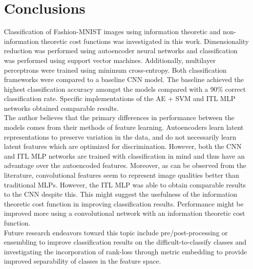 \documentclass[conference]{IEEEtran}
\begin{document}
\section{Conclusions} \label{Conclusions}
Classification of Fashion-MNIST images using information theoretic and non-information theoretic cost functions was investigated in this work.  Dimensionality reduction was performed using autoencoder neural networks and classification was performed using support vector machines. Additionally, multilayer perceptrons were trained using minimum cross-entropy.  Both classification frameworks were compared to a baseline CNN model.  The baseline achieved the highest classification accuracy amongst the models compared with a 90\% correct classification rate.  Specific implementations of the AE + SVM and ITL MLP networks obtained comparable results.\\
\indent The author believes that the primary differences in performance between the models comes from their methods of feature learning.  Autoencoders learn latent representations to preserve variation in the data, and do not necessarily learn latent features which are optimized for  discrimination.  However, both the CNN and ITL MLP networks are trained with classification in mind and thus have an advantage over the autoencoded features.  Moreover, as can be observed from the literature, convolutional features seem to represent image qualities better than traditional MLPs. However, the ITL MLP was able to obtain comparable results to the CNN despite this.  This might suggest the usefulness of the information theoretic cost function in improving classification results.  Performance might be improved more using a convolutional network with an  information theoretic cost function.  \\
\indent
Future research endeavors toward this topic include pre/post-processing or ensembling to improve classification results on the difficult-to-classify classes and investigating the incorporation of rank-loss through metric embedding to provide improved separability of classes in the feature space.

\end{document}

